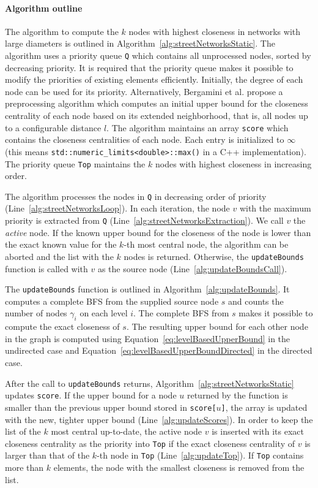 \paragraph{Algorithm outline}
The algorithm to compute the $k$ nodes with highest closeness in networks with large diameters is outlined in Algorithm~\ref{alg:streetNetworksStatic}. The algorithm uses a priority queue \texttt{Q} which contains all unprocessed nodes, sorted by decreasing priority. It is required that the priority queue makes it possible to modify the priorities of existing elements efficiently. Initially, the degree of each node can be used for its priority. Alternatively, Bergamini et al. propose a preprocessing algorithm which computes an initial upper bound for the closeness centrality of each node based on its extended neighborhood, that is, all nodes up to a configurable distance $l$. The algorithm maintains an array \texttt{score} which contains the closeness centralities of each node. Each entry is initialized to $\infty$ (this means \texttt{std::numeric\_limits<double>::max()} in a C++ implementation). The priority queue \texttt{Top} maintains the $k$ nodes with highest closeness in increasing order.

The algorithm processes the nodes in \texttt{Q} in decreasing order of priority (Line~\ref{alg:streetNetworksLoop}). In each iteration, the node $v$ with the maximum priority is extracted from \texttt{Q} (Line~\ref{alg:streetNetworksExtraction}). We call $v$ the \emph{active} node. If the known upper bound for the closeness of the node is lower than the exact known value for the $k$-th most central node, the algorithm can be aborted and the list with the $k$ nodes is returned. Otherwise, the \texttt{updateBounds} function is called with $v$ as the source node (Line~\ref{alg:updateBoundsCall}).

The \texttt{updateBounds} function is outlined in Algorithm~\ref{alg:updateBounds}. It computes a complete BFS from the supplied source node $s$ and counts the number of nodes $\gamma_i$ on each level $i$. The complete BFS from $s$ makes it possible to compute the exact closeness of $s$. The resulting upper bound for each other node in the graph is computed using Equation~\ref{eq:levelBasedUpperBound} in the undirected case and Equation~\ref{eq:levelBasedUpperBoundDirected} in the directed case.

After the call to \texttt{updateBounds} returns, Algorithm~\ref{alg:streetNetworksStatic} updates \texttt{score}. If the upper bound for a node $u$ returned by the function is smaller than the previous upper bound stored in \texttt{score[$u$]}, the array is updated with the new, tighter upper bound (Line~\ref{alg:updateScores}). In order to keep the list of the $k$ most central up-to-date, the active node $v$ is inserted with its exact closeness centrality as the priority into \texttt{Top} if the exact closeness centrality of $v$ is larger than that of the $k$-th node in \texttt{Top} (Line~\ref{alg:updateTop}). If \texttt{Top} contains more than $k$ elements, the node with the smallest closeness is removed from the list.

